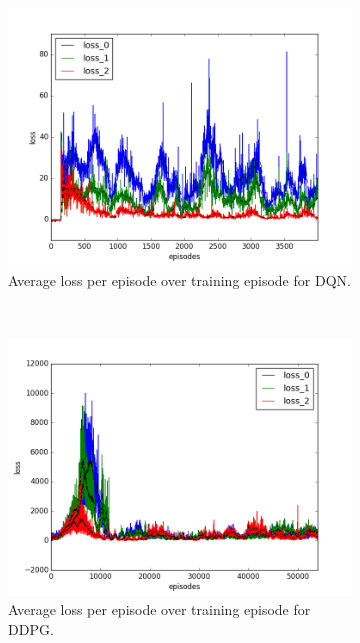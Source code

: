 \begin{figure}[h]
  \begin{subfigure}[h]{\figscale\linewidth}
    \includegraphics[trim=10 10 10 10,clip,width=\linewidth]
    {../results/dqn_2vs1/loss.png}
    \caption{Average loss per episode over training episode for DQN.}
    \label{fig:dqn-2vs1-loss}
  \end{subfigure}
  ~
  \begin{subfigure}[h]{\figscale\linewidth}
    \includegraphics[trim=10 10 10 10,clip,width=\linewidth]
    {../results/ddpg_2vs1/loss.png}
    \caption{Average loss per episode over training episode for DDPG.}
    \label{fig:ddpg-2vs1-loss}
  \end{subfigure}
  ~
  \begin{subfigure}[h]{\figscale\linewidth}

\end{subfigure}
\end{figure}
